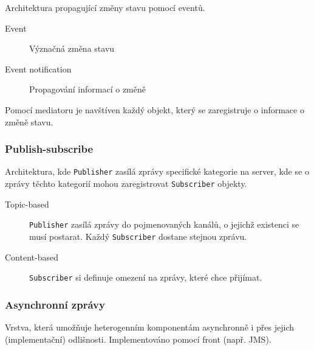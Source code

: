 Architektura propagující změny stavu pomocí eventů.

\begin{description}
    \item[Event] Význačná změna stavu
    \item[Event notification] Propagování informací o změně
\end{description}

Pomocí mediatoru je navštíven každý objekt, který se zaregistruje o informace o změně stavu.

\subsubsection{Publish-subscribe}

Architektura, kde \texttt{Publisher} zasílá zprávy specifické kategorie na server, kde se o zprávy těchto kategorií mohou zaregistrovat \texttt{Subscriber} objekty.

\begin{description}
    \item[Topic-based] \texttt{Publisher} zasílá zprávy do pojmenovaných kanálů, o jejichž existenci se musí postarat. Každý \texttt{Subscriber} dostane stejnou zprávu.
    \item[Content-based] \texttt{Subscriber} si definuje omezení na zprávy, které chce přijímat.
\end{description}

\subsubsection{Asynchronní zprávy}

Vrstva, která umožňuje heterogenním komponentám asynchronně i přes jejich (implementační) odlišnosti.
Implementováno pomocí front (např. JMS).
